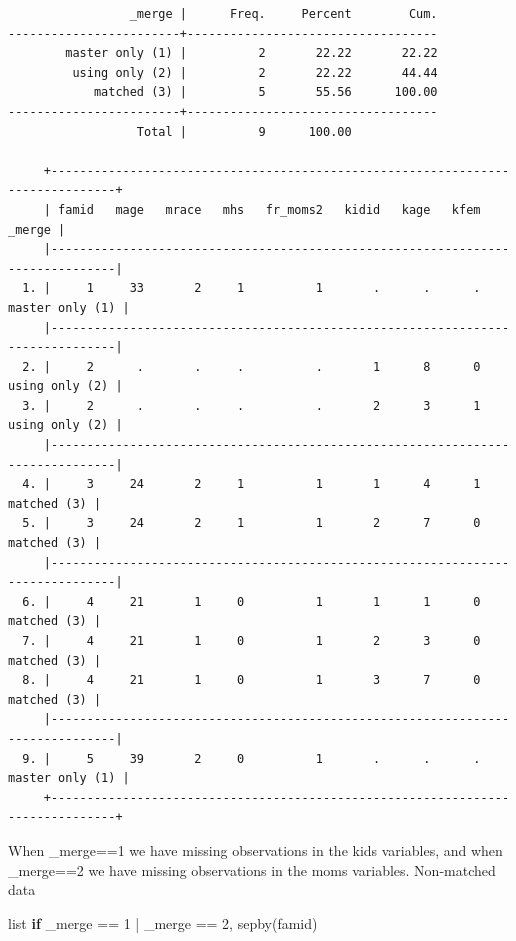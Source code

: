 \documentclass[
]{book}
\newenvironment{Shaded}{\begin{snugshade}}{\end{snugshade}}
\newcommand{\DataTypeTok}[1]{\textcolor[rgb]{0.13,0.29,0.53}{#1}}
\newcommand{\KeywordTok}[1]{\textcolor[rgb]{0.13,0.29,0.53}{\textbf{#1}}}
\newcommand{\NormalTok}[1]{#1}
\newcommand{\OtherTok}[1]{\textcolor[rgb]{0.56,0.35,0.01}{#1}}
\begin{document}
\begin{verbatim}
                 _merge |      Freq.     Percent        Cum.
------------------------+-----------------------------------
        master only (1) |          2       22.22       22.22
         using only (2) |          2       22.22       44.44
            matched (3) |          5       55.56      100.00
------------------------+-----------------------------------
                  Total |          9      100.00

     +-------------------------------------------------------------------------------+
     | famid   mage   mrace   mhs   fr_moms2   kidid   kage   kfem            _merge |
     |-------------------------------------------------------------------------------|
  1. |     1     33       2     1          1       .      .      .   master only (1) |
     |-------------------------------------------------------------------------------|
  2. |     2      .       .     .          .       1      8      0    using only (2) |
  3. |     2      .       .     .          .       2      3      1    using only (2) |
     |-------------------------------------------------------------------------------|
  4. |     3     24       2     1          1       1      4      1       matched (3) |
  5. |     3     24       2     1          1       2      7      0       matched (3) |
     |-------------------------------------------------------------------------------|
  6. |     4     21       1     0          1       1      1      0       matched (3) |
  7. |     4     21       1     0          1       2      3      0       matched (3) |
  8. |     4     21       1     0          1       3      7      0       matched (3) |
     |-------------------------------------------------------------------------------|
  9. |     5     39       2     0          1       .      .      .   master only (1) |
     +-------------------------------------------------------------------------------+
\end{verbatim}

When \_merge==1 we have missing observations in the kids variables, and when \_merge==2 we have missing observations in the moms variables.
Non-matched data

\begin{Shaded}
\begin{Highlighting}[]
\OtherTok{list} \KeywordTok{if} \DataTypeTok{\_merge}\NormalTok{ == 1 | }\DataTypeTok{\_merge}\NormalTok{ == 2, sepby(famid)}
\end{Highlighting}
\end{Shaded}
\end{document}
